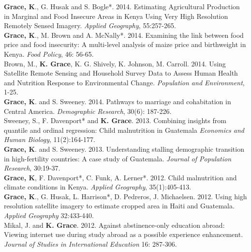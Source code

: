 \documentclass[11pt]{article} %
\begin{document}
\noindent
\textbf{Grace, K}., G. Husak and S. Bogle*. 2014.  Estimating Agricultural Production in Marginal and Food Insecure Areas in Kenya Using Very High Resolution Remotely Sensed Imagery. \textit{Applied Geography}, 55:257-265.\\

\noindent
\textbf{Grace, K}., M. Brown and A. McNally*. 2014. Examining the link between food price and food insecurity:  A multi-level analysis of maize price and birthweight in Kenya.   \textit{Food Policy}, 46: 56-65. \\


\noindent
Brown, M., \textbf{K. Grace}, K.  G. Shively, K. Johnson, M. Carroll. 2014. Using Satellite Remote Sensing and Household Survey Data to Assess Human Health and Nutrition Response to Environmental Change. \textit{Population and Environment}, 1-25.\\


\noindent
\textbf{Grace, K}. and S. Sweeney. 2014.  Pathways to marriage and cohabitation in Central America.  \textit{Demographic Research}, 30(6): 187-226.\\

\noindent
Sweeney, S., F. Davenport* and \textbf{K. Grace}. 2013. Combining insights from quantile and ordinal regression: Child malnutrition in Guatemala  \textit{Economics and Human Biology}, 11(2):164-177.\\

\noindent
\textbf{Grace, K}. and S. Sweeney. 2013. Understanding stalling demographic transition in high-fertility countries: A case study of Guatemala.  \textit{Journal of Population Research}, 30:19-37. \\

\noindent
\textbf{Grace, K}, F. Davenport*, C. Funk, A. Lerner*. 2012. Child malnutrition and climate conditions in Kenya. \textit{Applied Geography}, 35(1):405-413. \\


\noindent
\textbf{Grace, K}., G. Husak, L. Harrison*, D. Pedreros, J. Michaelsen. 2012. Using high resolution satellite imagery to estimate cropped area in Haiti and Guatemala. \textit{Applied Geography} 32:433-440.\\


\noindent
Mikal, J. and \textbf{K. Grace}. 2012.  Against abstinence-only education abroad: Viewing internet use during study abroad as a possible experience enhancement. \textit{Journal of Studies in International Education} 16: 287-306.\\
\end{document}
